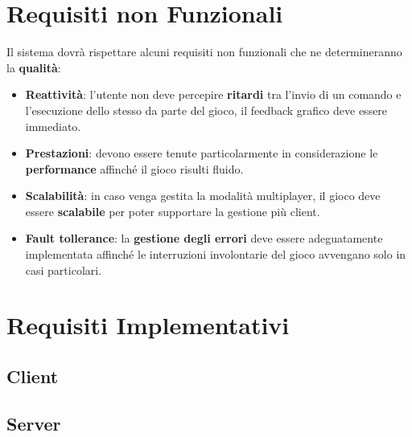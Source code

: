             
	\section{Requisiti non Funzionali}
        Il sistema dovrà rispettare alcuni requisiti non funzionali che ne determineranno la \textbf{qualità}:
        \begin{itemize}
            \item \textbf{Reattività}: l'utente non deve percepire \textbf{ritardi} tra l'invio di un comando e l'esecuzione dello stesso da parte del gioco, il feedback grafico deve essere immediato.
            
            \item \textbf{Prestazioni}: devono essere tenute particolarmente in considerazione le \textbf{performance} affinché il gioco risulti fluido.
            
            \item \textbf{Scalabilità}: in caso venga gestita la modalità multiplayer, il gioco deve essere \textbf{scalabile} per poter supportare la gestione più client.
            
            \item \textbf{Fault tollerance}: la \textbf{gestione degli errori} deve essere adeguatamente implementata affinché le interruzioni involontarie del gioco avvengano solo in casi particolari.
            

        \end{itemize}
	\section{Requisiti Implementativi}
        \subsection{Client}
        \subsection{Server}